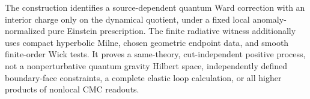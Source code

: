 The construction identifies a source-dependent quantum Ward correction with an interior charge only on the dynamical quotient, under a fixed local anomaly-normalized pure Einstein prescription. The finite radiative witness additionally uses compact hyperbolic Milne, chosen geometric endpoint data, and smooth finite-order Wick tests. It proves a same-theory, cut-independent positive process, not a nonperturbative quantum gravity Hilbert space, independently defined boundary-face constraints, a complete elastic loop calculation, or all higher products of nonlocal CMC readouts.

